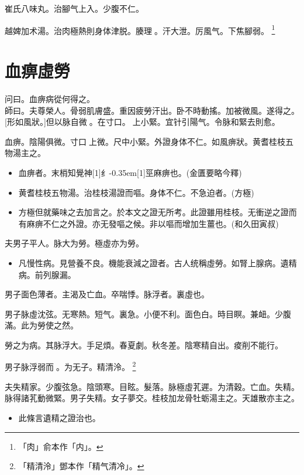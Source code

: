 \documentclass[11pt,oneside,b5paper]{ctexbook}
\begin{document}
\begin{flushleft}
崔氏八味丸。治腳气上入。少腹不仁。

越婢加术湯。治肉極熱則身体津脱。腠理{𫔭}。汗大泄。厉風气。下焦腳弱。
\footnote{「肉」俞本作「内」。}

\chapter{血痹虛勞}

问曰。血痹病從何得之。\\
師曰。夫尊榮人。骨弱肌膚盛。重因疲勞汗出。卧不時動搖。加被微風。遂得之。[形如風狀。]但以脉自微{𬈧}。在寸口。{𬮦}上小緊。宜针引陽气。令脉和緊去則愈。

血痹。陰陽俱微。寸口{𬮦}上微。尺中小緊。外證身体不仁。如風痹狀。黄耆桂枝五物湯主之。

\begin{itemize}
\item 血痹者。末梢知覺神{\hbox{\scalebox{0.68}[1]{纟}\kern-0.35em\scalebox{0.64}[1]{巠}}}麻痹也。(金匱要略今釋)
\item 黄耆桂枝五物湯。治桂枝湯證而嘔。身体不仁。不急迫者。(方極)
\item 方極但就藥味之去加言之。於本文之證无所考。此證雖用桂枝。无衝逆之證而有麻痹不仁之外證。亦无發嘔之候。非以嘔而增加生薑也。(和久田寅叔)
\end{itemize}

夫男子平人。脉大为勞。極虛亦为勞。

\begin{itemize}
\item 凡慢性病。見營養不良。機能衰減之證者。古人统稱虛勞。如腎上腺病。遺精病。前列腺漏。
\end{itemize}

男子面色薄者。主渴及亡血。卒喘悸。脉浮者。裏虛也。

男子脉虛沈弦。无寒熱。短气。裏急。小便不利。面色白。時目瞑。兼衄。少腹滿。此为勞使之然。

勞之为病。其脉浮大。手足煩。春夏劇。秋冬差。陰寒精自出。痠削不能行。

男子脉浮弱而{𬈧}。为无子。精清泠。
\footnote{「精清泠」鄧本作「精气清冷」。}

夫失精家。少腹弦急。陰頭寒。目眩。髮落。脉極虛芤遲。为清穀。亡血。失精。脉得諸芤動微緊。男子失精。女子夢交。桂枝加龙骨牡蛎湯主之。天雄散亦主之。

\begin{itemize}
\item 此條言遺精之證治也。
\end{itemize}


\end{flushleft}
\end{document}
